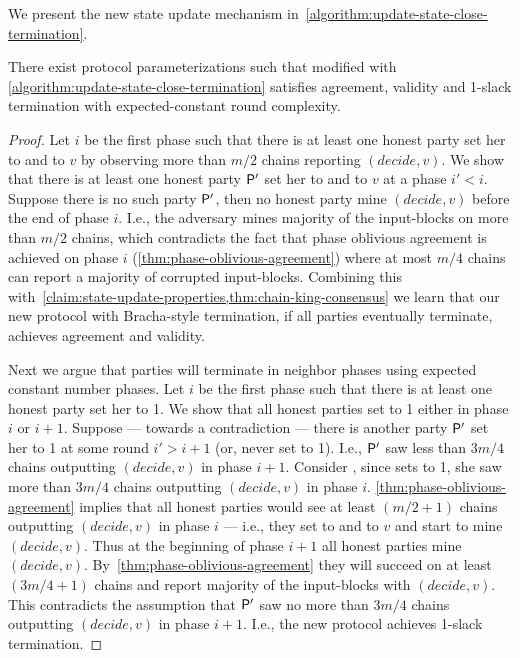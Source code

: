 We present the new state update mechanism in~\cref{algorithm:update-state-close-termination}.



\begin{theorem} \label{thm:bracha-termination}
    There exist protocol parameterizations such that \chainKingConsensus modified with \cref{algorithm:update-state-close-termination} satisfies agreement, validity and 1-slack termination with expected-constant round complexity.
\end{theorem}

\begin{proof}
    Let $i$ be the first phase such that there is at least one honest party \party set her \decide to \true and \val to $v$ by observing more than $m / 2$ chains reporting $(decide, v)$.
    We show that there is at least one honest party $\mathsf{P}'$ set her \decide to \true and \val to $v$ at a phase $i' < i$.
    Suppose there is no such party $\mathsf{P}'$, then no honest party mine $(decide, v)$ before the end of phase $i$.
    I.e., the adversary mines majority of the input-blocks on more than $m / 2$ chains, which contradicts the fact that phase oblivious agreement is achieved on phase $i$ (\cref{thm:phase-oblivious-agreement}) where at most $m / 4$ chains can report a majority of corrupted input-blocks.
    Combining this with~\cref{claim:state-update-properties,thm:chain-king-consensus} we learn that our new protocol with Bracha-style termination, if all parties eventually terminate, achieves agreement and validity.

    Next we argue that parties will terminate in neighbor phases using expected constant number phases.
    Let $i$ be the first phase such that there is at least one honest party \party set her \exit to 1.
    We show that all honest parties set \exit to 1 either in phase $i$ or $i + 1$.
    Suppose --- towards a contradiction --- there is another party $\mathsf{P}'$ set her \exit to 1 at some round $i' > i + 1$ (or, never set \exit to 1).
    I.e., $\mathsf{P}'$ saw less than $3m / 4$ chains outputting $(decide, v)$ in phase $i + 1$.
    Consider \party, since \party sets \exit to 1, she saw more than $3m / 4$ chains outputting $(decide, v)$ in phase $i$.
    \cref{thm:phase-oblivious-agreement} implies that all honest parties would see at least $(m / 2 + 1)$ chains outputting $(decide, v)$ in phase $i$ --- i.e., they set \decide to \true and \val to $v$ and start to mine $(decide, v)$.
    Thus at the beginning of phase $i + 1$ all honest parties mine $(decide, v)$.
    By~\cref{thm:phase-oblivious-agreement} they will succeed on at least $(3m / 4 + 1)$ chains and report majority of the input-blocks with $(decide, v)$.
    This contradicts the assumption that  $\mathsf{P}'$ saw no more than $3m / 4$ chains outputting $(decide, v)$ in phase $i + 1$.
    I.e., the new protocol achieves 1-slack termination.


\end{proof}
